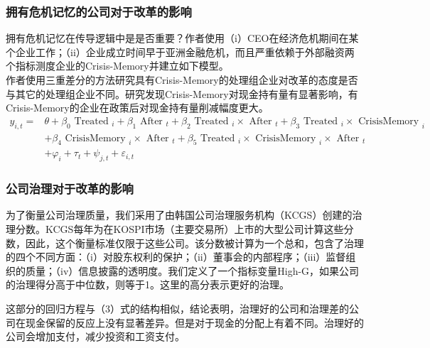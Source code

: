 \documentclass{article}
\begin{document}
\subsubsection{拥有危机记忆的公司对于改革的影响}
\indent 拥有危机记忆在传导逻辑中是是否重要？作者使用（i）CEO在经济危机期间在某个企业工作；（ii）企业成立时间早于亚洲金融危机，而且严重依赖于外部融资两个指标测度企业的Crisis-Memory并建立如下模型。\\
\indent 作者使用三重差分的方法研究具有Crisis-Memory的处理组企业对改革的态度是否与其它的处理组企业不同。研究发现Crisis-Memory对现金持有量有显著影响，有Crisis-Memory的企业在政策后对现金持有量削减幅度更大。\\
\begin{equation}
    \begin{split}
        y_{i, t}=&\theta+\beta_{0} \text { Treated }_{i}+\beta_{1} \text { After }_{t}+\beta_{2} \text { Treated }_{i} \times \text { After }_{t}+\beta_{3} \text { Treated }_{i} \times \text { CrisisMemory }_{i} \\ &+\beta_{4} \text { CrisisMemory }_{i} \times \text { After }_{t}+\beta_{5} \text { Treated }_{i} \times \text { CrisisMemory }_{i} \times \text { After }_{t} \\ &+\varphi_{i}+\tau_{t}+\psi_{j, t}+\varepsilon_{i, t} 
    \end{split}
\end{equation}

\subsubsection{公司治理对于改革的影响}
为了衡量公司治理质量，我们采用了由韩国公司治理服务机构（KCGS）创建的治理分数。KCGS每年为在KOSPI市场（主要交易所）上市的大型公司计算这些分数，因此，这个衡量标准仅限于这些公司。该分数被计算为一个总和，包含了治理的四个不同方面：（i）对股东权利的保护；（ii）董事会的内部程序；（iii）监督组织的质量；（iv）信息披露的透明度。我们定义了一个指标变量High-G，如果公司的治理得分高于中位数，则等于1。这里的高分表示更好的治理。

这部分的回归方程与（3）式的结构相似，结论表明，治理好的公司和治理差的公司在现金保留的反应上没有显著差异。但是对于现金的分配上有着不同。治理好的公司会增加支付，减少投资和工资支付。
\end{document}
